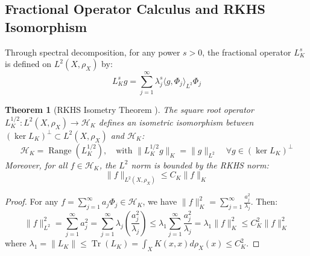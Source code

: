 \documentclass[11pt,a4paper]{article}
\newtheorem{theorem}{Theorem}[section]
\theoremstyle{definition}
\begin{document}
\subsection{Fractional Operator Calculus and RKHS Isomorphism}

Through spectral decomposition, for any power $s > 0$, the fractional operator $L_K^s$ is defined on $L^2(X, \rho_X)$ by:
\begin{equation}\label{eq:fractional_operator}
L_K^s g = \sum_{j=1}^\infty \lambda_j^s \langle g, \Phi_j \rangle_{L^2} \Phi_j
\end{equation}

\begin{theorem}[RKHS Isometry Theorem \cite{cucker2002}]\label{thm:rkhs_isometry}
The square root operator $L_K^{1/2}: L^2(X, \rho_X) \to \mathcal{H}_K$ defines an isometric isomorphism between $(\ker L_K)^\perp \subset L^2(X, \rho_X)$ and $\mathcal{H}_K$:
\begin{equation}\label{eq:rkhs_isometry}
\mathcal{H}_K = \operatorname{Range}(L_K^{1/2}), \quad \text{with } \|L_K^{1/2} g\|_K = \|g\|_{L^2} \quad \forall g \in (\ker L_K)^\perp
\end{equation}
Moreover, for all $f \in \mathcal{H}_K$, the $L^2$ norm is bounded by the RKHS norm:
\begin{equation}\label{eq:l2_rkhs_norm_bound}
\|f\|_{L^2(X, \rho_X)} \le C_K \|f\|_K
\end{equation}
\end{theorem}

\begin{proof}
For any $f = \sum_{j=1}^\infty a_j \Phi_j \in \mathcal{H}_K$, we have $\|f\|_K^2 = \sum_{j=1}^\infty \frac{a_j^2}{\lambda_j}$.
Then:
\[
\|f\|_{L^2}^2 = \sum_{j=1}^\infty a_j^2 = \sum_{j=1}^\infty \lambda_j \left( \frac{a_j^2}{\lambda_j} \right) \le \lambda_1 \sum_{j=1}^\infty \frac{a_j^2}{\lambda_j} = \lambda_1 \|f\|_K^2 \le C_K^2 \|f\|_K^2
\]
where $\lambda_1 = \|L_K\| \le \operatorname{Tr}(L_K) = \int_X K(x, x) d\rho_X(x) \le C_K^2$.
\end{proof}
\end{document}
